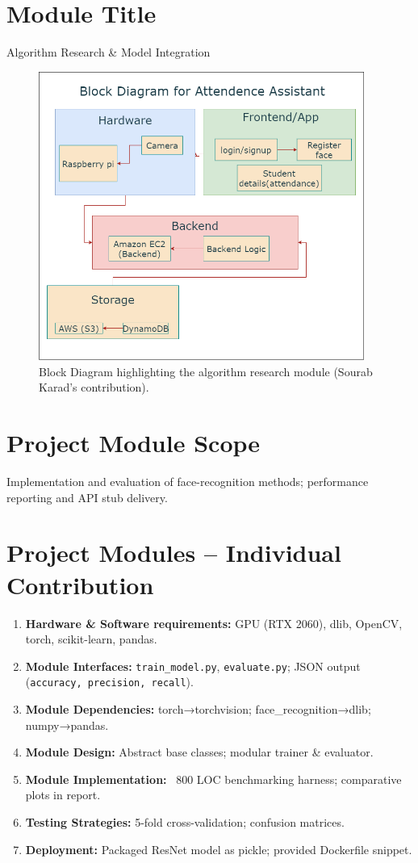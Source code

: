 \documentclass[openany]{report}
\begin{document}
\section{Module Title}
Algorithm Research \& Model Integration

\begin{figure}[H]
    \centering
    \includegraphics[width=0.95\textwidth]{../imgs/block diagram.png}
    \caption{Block Diagram highlighting the algorithm research module (Sourab Karad’s contribution).}
    \label{fig:block_diagram_sourab}
\end{figure}

\section{Project Module Scope}
Implementation and evaluation of face-recognition methods; performance reporting and API stub delivery.

\section{Project Modules – Individual Contribution}
\begin{enumerate}
  \item \textbf{Hardware \& Software requirements:} GPU (RTX 2060), dlib, OpenCV, torch, scikit-learn, pandas.
  \item \textbf{Module Interfaces:} \texttt{train\_model.py}, \texttt{evaluate.py}; JSON output (\texttt{accuracy, precision, recall}).
  \item \textbf{Module Dependencies:} torch→torchvision; face\_recognition→dlib; numpy→pandas.
  \item \textbf{Module Design:} Abstract base classes; modular trainer \& evaluator.
  \item \textbf{Module Implementation:} ~800 LOC benchmarking harness; comparative plots in report.
  \item \textbf{Testing Strategies:} 5-fold cross-validation; confusion matrices.
  \item \textbf{Deployment:} Packaged ResNet model as pickle; provided Dockerfile snippet.
\end{enumerate}
\end{document}
